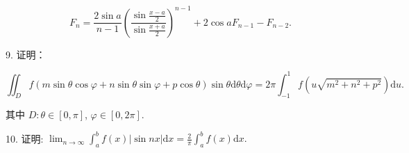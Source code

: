 \documentclass{examcollection}
\renewcommand{\displayformula}[1]{\[#1\]}
\begin{document}
{\begin{minipage}{\textwidth}
\displayformula{F _ {n} = \frac {2 \sin a}{n - 1} \left(\frac {\sin \frac {x - a}{2}}{\sin \frac {x + a}{2}}\right) ^ {n - 1} + 2 \cos a F _ {n - 1} - F _ {n - 2}.}\par
9. 证明：\par
\displayformula{\iint_ {D} f (m \sin \theta \cos \varphi + n \sin \theta \sin \varphi + p \cos \theta) \sin \theta \mathrm{d} \theta \mathrm{d} \varphi = 2 \pi \int_ {- 1} ^ {1} f (u \sqrt {m ^ {2} + n ^ {2} + p ^ {2}}) \mathrm{d} u.}\par
其中 $D: \theta \in [0, \pi]$, $\varphi \in [0, 2\pi]$.\par
10. 证明: $\lim_{n\to \infty}\int_{a}^{b}f(x)|\sin nx|\mathrm{d}x = \frac{2}{\pi}\int_{a}^{b}f(x)\mathrm{d}x.$\par
\end{minipage}}
\ifdim\dimexpr\ht\proofbox+\dp\proofbox\relax>\textheight
\noindent\resizebox{!}{\textheight}{\usebox{\proofbox}}\else\noindent\usebox{\proofbox}\fi\clearpage
\end{document}
